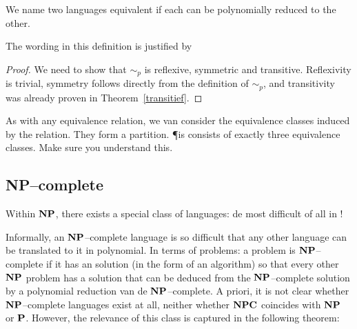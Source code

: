 We name two languages equivalent if each can be polynomially reduced
to the other.





The wording in this definition is justified by 



\begin{proof} We need to show that $\sim_p$ is reflexive, symmetric
and transitive. Reflexivity is trivial, symmetry follows directly from
the definition of $\sim_p$, and transitivity was already proven in
Theorem~\ref{transitief}.
\end{proof}

As with any equivalence relation, we van consider the equivalence
classes induced by the relation. They form a partition. \P is consists
of exactly three equivalence classes. Make sure you understand this.


\subsection{NP--complete}

Within $\NP$, there exists a special class of languages: de most
difficult of all in \NP !



Informally, an $\NP$--complete language is so difficult that any other
language can be translated to it in polynomial. In terms of problems:
a problem is $\NP$--complete if it has an solution (in the form of an
algorithm) so that every other $\NP$ problem has a solution that can
be deduced from the $\NP$--complete solution by a polynomial reduction
van de $\NP$--complete. A priori, it is not clear whether
$\NP$--complete languages exist at all, neither whether $\NPC$
coincides with $\NP$ or $\P$. However, the relevance of this class is
captured in the following theorem:

